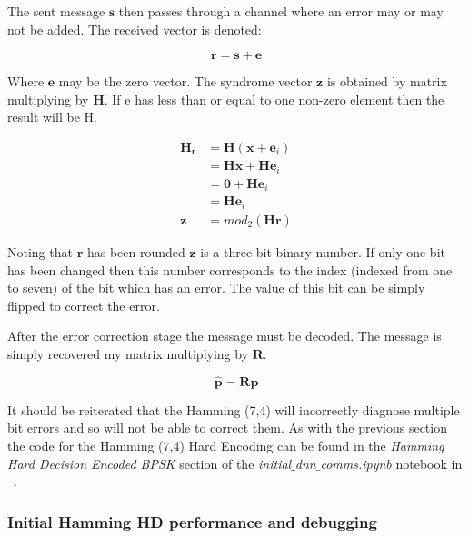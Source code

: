 \documentclass[12pt,onecolumn,letterpaper]{article}
\newcommand{\code}{\textit}
\begin{document}
The sent message $\mathbf{s}$ then passes through a channel where an error may or may not be added. The received vector is denoted:

\begin{equation}
   \mathbf{r} = \mathbf{s} + \mathbf{e}
\end{equation}

Where $\mathbf{e}$ may be the zero vector. The syndrome vector $\mathbf{z}$ is obtained by matrix multiplying by $\mathbf{H}$. If e has less than or equal to one non-zero element then the result will be H.

\begin{align}
   \mathbf{H_r} &= \mathbf{H}(\mathbf{x} + \mathbf{e}_i) \\
   &= \mathbf{Hx} + \mathbf{He}_i \\
   &= \mathbf{0} + \mathbf{He}_i \\
   &= \mathbf{He}_i \\
   \mathbf{z} &= mod_2\left(\mathbf{Hr}\right)
\end{align}

Noting that $\mathbf{r}$ has been rounded $\mathbf{z}$ is a three bit binary number. If only one bit has been changed then this number corresponds to the index (indexed from one to seven) of the bit which has an error. The value of this bit can be simply flipped to correct the error.

After the error correction stage the message must be decoded. The message is simply recovered my matrix multiplying by $\mathbf{R}$.

\begin{equation}
   \hat{\mathbf{p}} = \mathbf{Rp}
\end{equation}

It should be reiterated that the Hamming (7,4) will incorrectly diagnose multiple bit errors and so will not be able to correct them. As with the previous section the code for the Hamming (7,4) Hard Encoding can be found in the \textit{Hamming Hard Decision Encoded BPSK} section of the \code{initial$\_$dnn$\_$comms.ipynb} notebook in ~\cite{AwGithub}.

\subsubsection{Initial Hamming HD performance and debugging}
\end{document}
